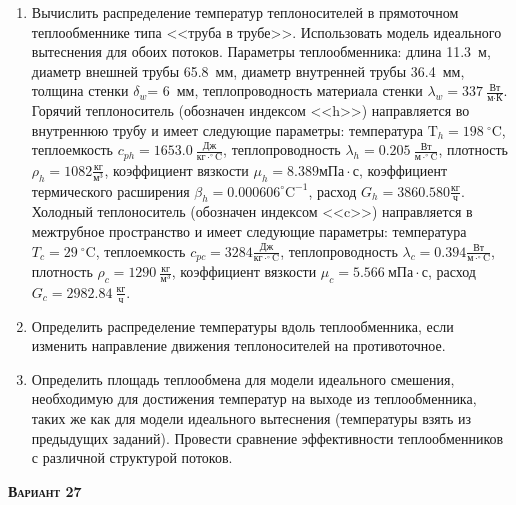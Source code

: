 \begin{enumerate} 
\item Вычислить распределение температур теплоносителей в прямоточном теплообменнике типа <<труба в трубе>>. Использовать модель идеального вытеснения для обоих потоков. Параметры теплообменника: длина  11.3~м, диаметр внешней трубы 65.8~мм,  диаметр внутренней трубы 36.4~мм, толщина стенки $\delta_{w}$=     6~мм,  теплопроводность материала стенки $\lambda_{w}=  337~\frac{\text{Вт}}{\text{м} \cdot \text{К}}$.  Горячий теплоноситель (обозначен индексом <<h>>) направляется во внутреннюю трубу и	 имеет следующие параметры: температура $\text{T}_{h}= 198~^\circ\mathrm{C}$, теплоемкость	  $c_{p{h}}= 1653.0~\frac{\text{Дж}}{\text{кг} \cdot ^\circ\mathrm{C}}$, теплопроводность 		$\lambda_{h}= 0.205~\frac{\text{Вт}}{\text{м} \cdot ^\circ\mathrm{C}}$, плотность 		$\rho_{h}= 1082 \frac{\text{кг}}{\text{м}^3}$, коэффициент вязкости $\mu_{h}=8.389 \text{мПа} 		\cdot \text{с} $, коэффициент термического расширения $\beta_{h}=0.000606 ^\circ\mathrm{C}^{-1}$,		 расход $G_{h}= 3860.580 \frac{\text{кг}}{\text{ч}}$. Холодный теплоноситель (обозначен индексом <<c>>) 		 направляется в межтрубное пространство и имеет следующие параметры: температура $T_{c}=   29		 ~^\circ\mathrm{C}$, теплоемкость $c_{p{c}}= 3284 \frac{\text{Дж}}{\text{кг} \cdot ^\circ\mathrm{C}}$,			 теплопроводность $\lambda_{c}=0.394 \frac{\text{Вт}}{\text{м} \cdot ^\circ\mathrm{C}}$, плотность 			 $\rho_{c}=  1290~\frac{\text{кг}}{\text{м}^3}$, коэффициент вязкости $\mu_{c}=5.566~\text{мПа} \cdot \text{с} $, 			 расход $G_{c}=2982.84~\frac{\text{кг}}{\text{ч}}$. 

\item Определить распределение температуры вдоль теплообменника, если 	изменить направление движения теплоносителей на противоточное.

\item Определить площадь теплообмена для модели идеального смешения, необходимую для достижения 	температур на выходе из теплообменника, таких же как для модели идеального вытеснения (температуры взять из предыдущих заданий).	Провести сравнение эффективности теплообменников с различной структурой потоков.

\end{enumerate}

\textsc{\textbf{Вариант 27}}

